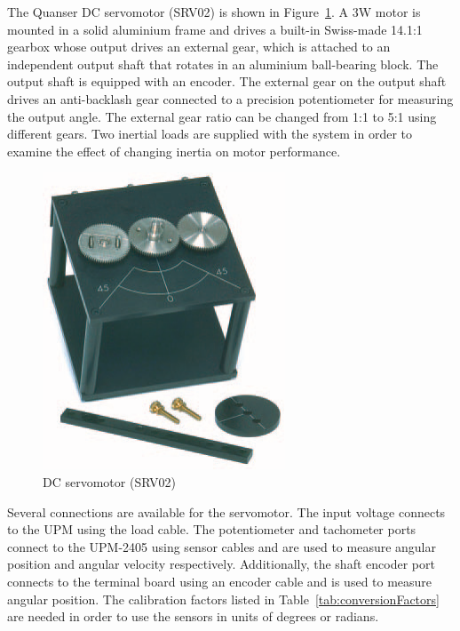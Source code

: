 The Quanser DC servomotor (SRV02) is shown in Figure~\ref{fig:motor}\@.  A 3W
motor is mounted in a solid aluminium frame and drives a built-in Swiss-made
14.1:1 gearbox whose output drives an external gear, which is attached to an
independent output shaft that rotates in an aluminium ball-bearing block.
The output shaft is equipped with an encoder.  The external gear on the
output shaft drives an anti-backlash gear connected to a precision
potentiometer for measuring the output angle.  The external gear ratio can be
changed from 1:1 to 5:1 using different gears.  Two inertial loads are
supplied with the system in order to examine the effect of changing inertia
on motor performance.
\begin{figure}[htbp]
    \centering
    \includegraphics[width=0.6\hsize]{pix/motor-eps-converted-to.pdf}
    \caption{DC servomotor (SRV02)}\label{fig:motor}
\end{figure}%
Several connections are available for the servomotor. The input voltage
connects to the UPM using the load cable.  The potentiometer and tachometer
ports connect to the UPM-2405 using sensor cables and are used to measure
angular position and angular velocity respectively.  Additionally, the shaft
encoder port connects to the terminal board using an encoder cable and is
used to measure angular position.  The calibration factors listed in
Table~\ref{tab:conversionFactors} are needed in order to use the sensors in
units of degrees or radians.

